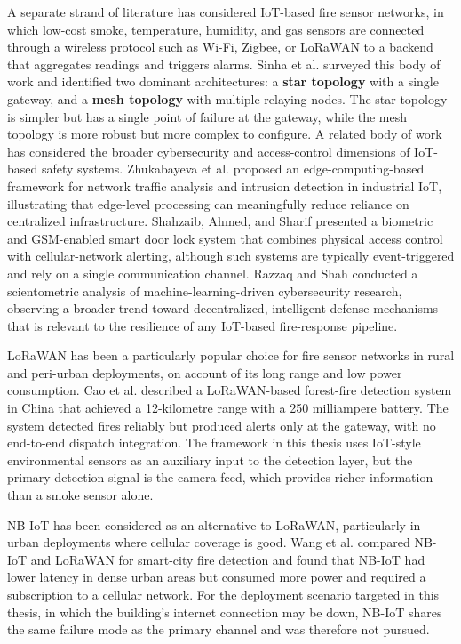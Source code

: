 A separate strand of literature has considered IoT-based fire sensor networks, in which low-cost smoke, temperature, humidity, and gas sensors are connected through a wireless protocol such as Wi-Fi, Zigbee, or LoRaWAN to a backend that aggregates readings and triggers alarms. Sinha et al. \cite{sinha2022iotfire} surveyed this body of work and identified two dominant architectures: a \textbf{star topology} with a single gateway, and a \textbf{mesh topology} with multiple relaying nodes. The star topology is simpler but has a single point of failure at the gateway, while the mesh topology is more robust but more complex to configure. A related body of work has considered the broader cybersecurity and access-control dimensions of IoT-based safety systems. Zhukabayeva et al. \cite{zhukabayeva2025edge} proposed an edge-computing-based framework for network traffic analysis and intrusion detection in industrial IoT, illustrating that edge-level processing can meaningfully reduce reliance on centralized infrastructure. Shahzaib, Ahmed, and Sharif \cite{shahzaib2025doorlock} presented a biometric and GSM-enabled smart door lock system that combines physical access control with cellular-network alerting, although such systems are typically event-triggered and rely on a single communication channel. Razzaq and Shah \cite{razzaq2025cybersecurity} conducted a scientometric analysis of machine-learning-driven cybersecurity research, observing a broader trend toward decentralized, intelligent defense mechanisms that is relevant to the resilience of any IoT-based fire-response pipeline.

LoRaWAN has been a particularly popular choice for fire sensor networks in rural and peri-urban deployments, on account of its long range and low power consumption. Cao et al. \cite{cao2023lorafire} described a LoRaWAN-based forest-fire detection system in China that achieved a 12-kilometre range with a 250 milliampere battery. The system detected fires reliably but produced alerts only at the gateway, with no end-to-end dispatch integration. The framework in this thesis uses IoT-style environmental sensors as an auxiliary input to the detection layer, but the primary detection signal is the camera feed, which provides richer information than a smoke sensor alone.

NB-IoT has been considered as an alternative to LoRaWAN, particularly in urban deployments where cellular coverage is good. Wang et al. \cite{wang2024nbiot} compared NB-IoT and LoRaWAN for smart-city fire detection and found that NB-IoT had lower latency in dense urban areas but consumed more power and required a subscription to a cellular network. For the deployment scenario targeted in this thesis, in which the building's internet connection may be down, NB-IoT shares the same failure mode as the primary channel and was therefore not pursued.


